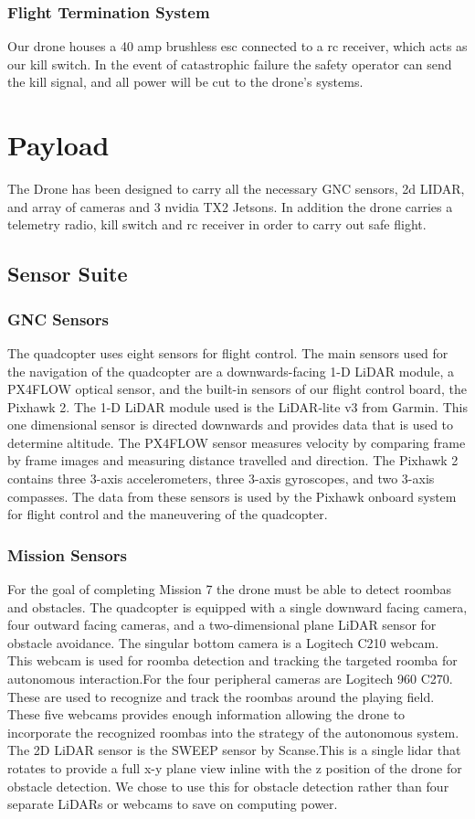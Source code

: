 \documentclass[12pt,letterpaper]{article}
\begin{document}
		\subsubsection*{Flight Termination System}
			Our drone houses a 40 amp brushless esc connected to a rc receiver, which acts as our kill switch. In the event of catastrophic failure the safety operator can send the kill signal, and all power will be cut to the drone’s systems.


\section*{Payload}
	The Drone has been designed to carry all the necessary GNC sensors, 2d LIDAR, and array of cameras and 3 nvidia TX2 Jetsons. In addition the drone carries a telemetry radio, kill switch and rc receiver in order to carry out safe flight. 
	\subsection*{Sensor Suite}
		\subsubsection*{GNC Sensors}
			The quadcopter uses eight sensors for flight control. The main sensors used for the navigation of the quadcopter are a downwards-facing 1-D LiDAR module, a PX4FLOW optical sensor, and the built-in sensors of our flight control board, the Pixhawk 2.
    		The 1-D LiDAR module used is the LiDAR-lite v3 from Garmin. This one dimensional sensor is directed downwards and provides data that is used to determine altitude. The PX4FLOW sensor measures velocity by comparing frame by frame images and measuring distance travelled and direction. The Pixhawk 2 contains three 3-axis accelerometers, three 3-axis gyroscopes, and two 3-axis compasses. The data from these sensors is used by the Pixhawk onboard system for flight control and the maneuvering of the quadcopter. 

		\subsubsection*{Mission Sensors}
			For the goal of completing Mission 7 the drone must be able to detect roombas and obstacles. The quadcopter is equipped with a single downward facing camera, four outward facing cameras, and a two-dimensional plane LiDAR sensor for obstacle avoidance.
			The singular bottom camera is a Logitech C210 webcam. This webcam is used for roomba detection and tracking the targeted roomba for autonomous interaction.For the four peripheral cameras are Logitech 960 C270. These are used to recognize and track the roombas around the playing field. These five webcams provides enough information allowing the drone to incorporate the recognized roombas into the strategy of the autonomous system. 
			The 2D LiDAR sensor is the SWEEP sensor by Scanse.This is a single lidar that rotates to provide a full x-y plane view inline with the z position of the drone for obstacle detection. We chose to use this for obstacle detection rather than four separate LiDARs or webcams to save on computing power.
\end{document}

